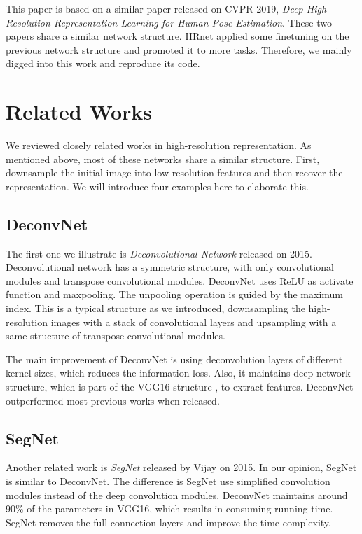 \documentclass[10pt,twocolumn,letterpaper]{article}
\begin{document}
This paper is based on a similar paper released on CVPR 2019,
\emph{Deep High-Resolution Representation Learning for Human Pose Estimation}.\cite{sun2019deep}
These two papers share a similar network structure.
HRnet applied some finetuning on the previous network structure and promoted it to more tasks.
Therefore, we mainly digged into this work and reproduce its code.

\section{Related Works}

We reviewed closely related works in high-resolution representation.
As mentioned above, most of these networks share a similar structure.
First, downsample the initial image into low-resolution features and then recover the representation.
We will introduce four examples here to elaborate this.

\subsection{DeconvNet}

The first one we illustrate is \emph{Deconvolutional Network} released on 2015.\cite{noh2015learning}
Deconvolutional network has a symmetric structure,
with only convolutional modules and transpose convolutional modules.
DeconvNet uses ReLU as activate function and maxpooling.
The unpooling operation is guided by the maximum index.
This is a typical structure as we introduced,
downsampling the high-resolution images with a stack of convolutional layers and upsampling with a same structure of transpose convolutional modules.

The main improvement of DeconvNet is using deconvolution layers of different kernel sizes,
which reduces the information loss.
Also, it maintains deep network structure, which is part of the VGG16 structure \cite{zhang2015accelerating}, to extract features.
DeconvNet outperformed most previous works when released.

\subsection{SegNet}

Another related work is \emph{SegNet} released by Vijay on 2015.\cite{badrinarayanan2015segnet}
In our opinion, SegNet is similar to DeconvNet.
The difference is SegNet use simplified convolution modules instead of the deep convolution modules.
DeconvNet maintains around 90\% of the parameters in VGG16,
which results in consuming running time.
SegNet removes the full connection layers and improve the time complexity.
\end{document}

